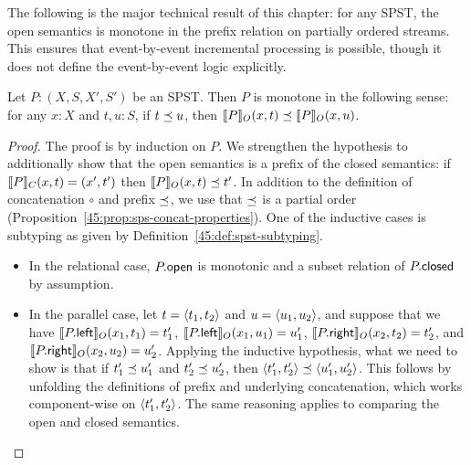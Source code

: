 The following is the major technical result of this chapter: for any SPST, the open semantics is monotone in the prefix relation on partially ordered streams.
This ensures that event-by-event incremental processing is possible, though it does not define the event-by-event logic explicitly.

\begin{theorem}
\label{45:thm:spst-monotonicity}
Let $P: (X, S, X', S')$ be an SPST.
Then $P$ is monotone in the following sense:
for any $x: X$ and $t, u: S$,
if $t\prefix u$,
then $\spstsemO{x}{t}{P} \prefix \spstsemO{x}{u}{P}$.
\end{theorem}
\begin{proof}
  The proof is by induction on $P$.
  We strengthen the hypothesis to additionally show that
  the open semantics is a prefix of the closed semantics:
  if $\spstsemC{x}{t}{P} = (x', t')$ then $\spstsemO{x}{t}{P} \prefix t'$.
  In addition to the definition of concatenation $\circ$
  and prefix $\prefix$,
  we use that $\prefix$ is a partial order
  (Proposition~\ref{45:prop:sps-concat-properties}).
  One of the inductive cases is subtyping
  as given by Definition~\ref{45:def:spst-subtyping}.
  \begin{itemize}
  \item In the relational case,
  $\spstfield{P}{open}$ is monotonic and a subset relation
  of $\spstfield{P}{closed}$ by assumption.
  \item In the parallel case,
  let $t = \spspar{t_1}{t_2}$ and $u = \spspar{u_1}{u_2}$,
  and suppose that we have
  $\spstsemO{x_1}{t_1}{\spstfield{P}{left}} = t_1'$,
  $\spstsemO{x_1}{u_1}{\spstfield{P}{left}} = u_1'$,
  $\spstsemO{x_2}{t_2}{\spstfield{P}{right}} = t_2'$, and
  $\spstsemO{x_2}{u_2}{\spstfield{P}{right}} = u_2'$.
  Applying the inductive hypothesis, what we need to
  show is that if $t_1' \prefix u_1'$ and $t_2' \prefix u_2'$,
  then
  $\spspar{t_1'}{t_2'} \prefix \spspar{u_1'}{u_2'}$.
  This follows by unfolding the definitions of prefix and underlying concatenation,
  which works component-wise on $\spspar{t_1'}{t_2'}$.
  The same reasoning applies to
  comparing the open and closed semantics.


\end{itemize}
\end{proof}
